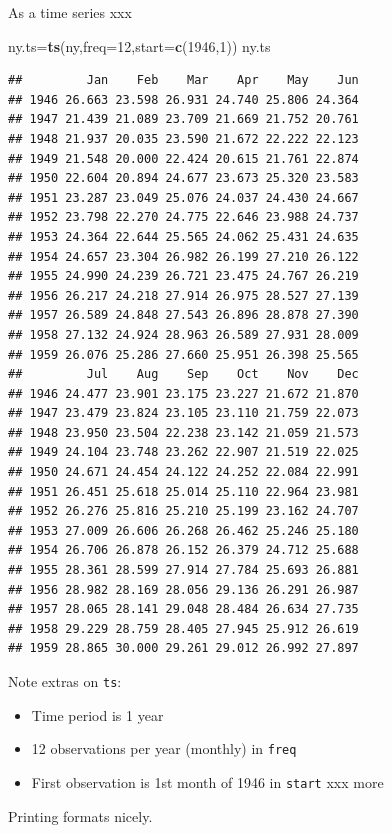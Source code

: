 \documentclass[ignorenonframetext,]{beamer}
\newenvironment{Shaded}{\begin{snugshade}}{\end{snugshade}}
\newcommand{\DataTypeTok}[1]{\textcolor[rgb]{0.13,0.29,0.53}{#1}}
\newcommand{\DecValTok}[1]{\textcolor[rgb]{0.00,0.00,0.81}{#1}}
\newcommand{\KeywordTok}[1]{\textcolor[rgb]{0.13,0.29,0.53}{\textbf{#1}}}
\newcommand{\NormalTok}[1]{#1}
\providecommand{\tightlist}{%
  \setlength{\itemsep}{0pt}\setlength{\parskip}{0pt}}
\begin{document}
\begin{frame}[fragile]{As a time series xxx}
\protect\hypertarget{as-a-time-series-xxx}{}

\begin{Shaded}
\begin{Highlighting}[]
\NormalTok{ny.ts=}\KeywordTok{ts}\NormalTok{(ny,}\DataTypeTok{freq=}\DecValTok{12}\NormalTok{,}\DataTypeTok{start=}\KeywordTok{c}\NormalTok{(}\DecValTok{1946}\NormalTok{,}\DecValTok{1}\NormalTok{))}
\NormalTok{ny.ts}
\end{Highlighting}
\end{Shaded}

\begin{verbatim}
##         Jan    Feb    Mar    Apr    May    Jun
## 1946 26.663 23.598 26.931 24.740 25.806 24.364
## 1947 21.439 21.089 23.709 21.669 21.752 20.761
## 1948 21.937 20.035 23.590 21.672 22.222 22.123
## 1949 21.548 20.000 22.424 20.615 21.761 22.874
## 1950 22.604 20.894 24.677 23.673 25.320 23.583
## 1951 23.287 23.049 25.076 24.037 24.430 24.667
## 1952 23.798 22.270 24.775 22.646 23.988 24.737
## 1953 24.364 22.644 25.565 24.062 25.431 24.635
## 1954 24.657 23.304 26.982 26.199 27.210 26.122
## 1955 24.990 24.239 26.721 23.475 24.767 26.219
## 1956 26.217 24.218 27.914 26.975 28.527 27.139
## 1957 26.589 24.848 27.543 26.896 28.878 27.390
## 1958 27.132 24.924 28.963 26.589 27.931 28.009
## 1959 26.076 25.286 27.660 25.951 26.398 25.565
##         Jul    Aug    Sep    Oct    Nov    Dec
## 1946 24.477 23.901 23.175 23.227 21.672 21.870
## 1947 23.479 23.824 23.105 23.110 21.759 22.073
## 1948 23.950 23.504 22.238 23.142 21.059 21.573
## 1949 24.104 23.748 23.262 22.907 21.519 22.025
## 1950 24.671 24.454 24.122 24.252 22.084 22.991
## 1951 26.451 25.618 25.014 25.110 22.964 23.981
## 1952 26.276 25.816 25.210 25.199 23.162 24.707
## 1953 27.009 26.606 26.268 26.462 25.246 25.180
## 1954 26.706 26.878 26.152 26.379 24.712 25.688
## 1955 28.361 28.599 27.914 27.784 25.693 26.881
## 1956 28.982 28.169 28.056 29.136 26.291 26.987
## 1957 28.065 28.141 29.048 28.484 26.634 27.735
## 1958 29.229 28.759 28.405 27.945 25.912 26.619
## 1959 28.865 30.000 29.261 29.012 26.992 27.897
\end{verbatim}

Note extras on \texttt{ts}:

\begin{itemize}
\tightlist
\item
  Time period is 1 year
\item
  12 observations per year (monthly) in \texttt{freq}
\item
  First observation is 1st month of 1946 in \texttt{start} xxx more
\end{itemize}

Printing formats nicely.

\end{frame}
\end{document}
